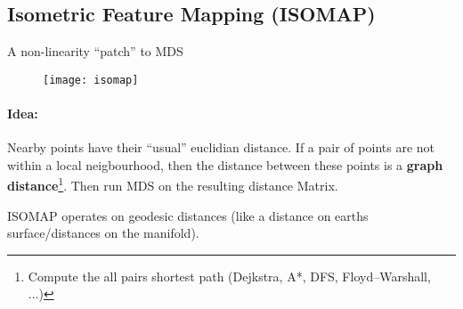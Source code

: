 
\subsection*{Isometric Feature Mapping (ISOMAP)}
A non-linearity ``patch'' to MDS

\begin{figure}[H]
	\centering
	\texttt{[image: isomap]}
\end{figure}

\paragraph{Idea:} Nearby points have their ``usual'' euclidian distance. If a pair of points are not within a local neigbourhood, then the distance between these points is a \textbf{graph distance}\footnote{Compute the all pairs shortest path (Dejkstra, A*,  DFS, Floyd–Warshall, ...)}. Then run MDS on the resulting distance Matrix.

ISOMAP operates on geodesic distances (like a distance on earths surface/distances on the manifold).

